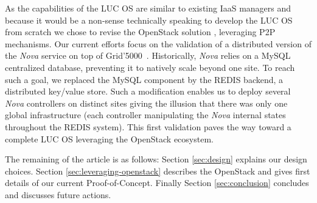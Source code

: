 As the capabilities of the LUC OS  are similar to existing IaaS managers
and because it would be a non-sense technically speaking to develop
the LUC OS from scratch
%
we chose to revise the OpenStack solution
\cite{openstack}, leveraging P2P mechanisms. Our current efforts focus
on the validation of a distributed version of the \emph{Nova} service
on top of Grid'5000~\cite{grid5000}. Historically, \emph{Nova} relies
on a MySQL centralized database, preventing it to natively scale
beyond one site. To reach such a goal, we replaced
the MySQL component
by the REDIS backend, a distributed key/value store. Such a modification
enables us to deploy several \emph{Nova} controllers on distinct sites
giving the illusion that there was only one global infrastructure (each
controller
manipulating the \emph{Nova} internal states throughout the REDIS
system).
 This first validation paves
the way toward a complete LUC OS leveraging  the OpenStack ecosystem.


The remaining of the article is as follows: Section
\ref{sec:design} explains our design choices. Section
\ref{sec:leveraging-openstack}
describes the OpenStack and gives first details of our current
Proof-of-Concept.
Finally
Section \ref{sec:conclusion}
concludes and discusses future actions.
